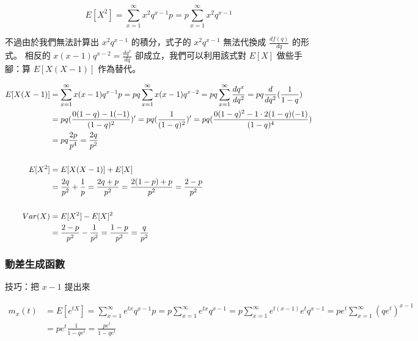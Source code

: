 \documentclass{article}
\begin{document}
\[ E[X^2]=\sum_{x=1}^\infty{x^2 q^{x-1}p}
         =p\sum_{x=1}^\infty{x^2 q^{x-1}} \]

\bigskip
不過由於我們無法計算出 \( x^2 q^{x-1} \) 的積分，式子的 \( x^2 q^{x-1} \) 無法代換成 \( \frac{d f(q)}{dq} \) 的形式。
相反的 \( x(x-1)q^{x-2} = \frac{d q^x}{dq} \) 卻成立，我們可以利用該式對 \( E[X] \) 做些手腳：算 \( E[X(X-1)] \) 作為替代。

\begin{align*}
E[X(X-1)]
& =   \sum_{x=1}^\infty{x(x-1)q^{x-1}p}
  = pq\sum_{x=1}^\infty{x(x-1)q^{x-2}}
  = pq\sum_{x=1}^\infty{\frac{d q^x}{dq^2}}
  = pq\frac{d}{dq^2}(\frac{1}{1-q}) \\
& = pq(\frac{0(1-q)-1(-1)}{(1-q)^2})'
  = pq(\frac{1}{(1-q)^2})'
  = pq(\frac{0(1-q)^2-1\cdot2(1-q)(-1)}{(1-q)^4}) \\
& = pq\frac{2p}{p^4}
  =   \frac{2q}{p^2} \\
\bigskip \\
E[X^2] & = E[X(X-1)]+E[X] \\
& = \frac{2q}{p^2}+\frac{1}{p}
  = \frac{2q+p}{p^2}
  = \frac{2(1-p)+p}{p^2}
  = \frac{2-p}{p^2} \\
\bigskip \\
Var(X) & = E[X^2]-E[X]^2 \\
& = \frac{2-p}{p^2}-\frac{1}{p^2}
  = \frac{1-p}{p^2}
  = \frac{q}{p^2}
\end{align*}

\subsubsection{動差生成函數}

\bigskip
技巧：把 \( x-1 \) 提出來

\begin{align*}
m_x(t)
& = E[e^{tX}]
  = \sum_{x=1}^\infty{e^{tx}q^{x-1}p}
  = p\sum_{x=1}^\infty{e^{tx}q^{x-1}}
  = p\sum_{x=1}^\infty{e^{t(x-1)}e^t q^{x-1}}
  = pe^t\sum_{x=1}^\infty{(qe^t)^{x-1}} \\
& = pe^t\frac{1}{1-qe^t}
  = \frac{pe^t}{1-qe^t}
\end{align*}

\clearpage
\end{document}
